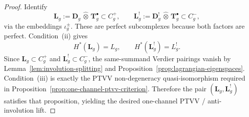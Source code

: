 \begin{proof}
Identify
\[
\mathbf{L}_g := \mathbf{D}_g \,\widehat{\otimes}\, \mathbf{T}_g^\bullet
\subset C_g^+,
\qquad
\mathbf{L}_g^! := \mathbf{D}_g^! \,\widehat{\otimes}\, \mathbf{T}_g^\bullet
\subset C_g^-,
\]
via the embeddings $\iota_g^\pm$.
These are perfect subcomplexes because both factors are perfect.
Condition~\textup{(ii)} gives
\[
H^*(\mathbf{L}_g)=L_g,
\qquad
H^*(\mathbf{L}_g^!)=L_g^!.
\]
Since $\mathbf{L}_g \subset C_g^+$ and
$\mathbf{L}_g^! \subset C_g^-$, the same-summand Verdier pairings
vanish by Lemma~\ref{lem:involution-splitting} and
Proposition~\ref{prop:lagrangian-eigenspaces}.  Condition~\textup{(iii)}
is exactly the PTVV non-degeneracy quasi-isomorphism required in
Proposition~\ref{prop:one-channel-ptvv-criterion}.  Therefore the pair
$(\mathbf{L}_g,\mathbf{L}_g^!)$ satisfies that proposition, yielding
the desired one-channel PTVV / anti-involution lift.
\end{proof}

